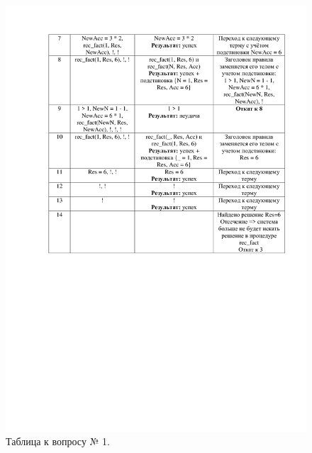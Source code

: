 \documentclass[14pt]{report}
\begin{document}
\begin{figure}[H]
	\centering
	\includegraphics[scale=0.26]{1.jpg}
	\caption{Таблица к вопросу № 1.}
	\label{d:matr_rec}
\end{figure}
\end{document}
